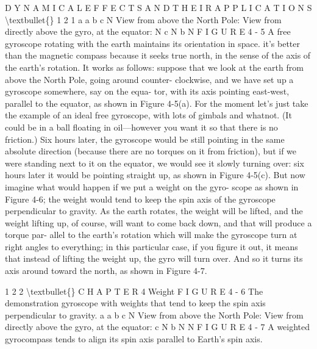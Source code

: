 \documentclass[10pt,oneside]{article}
\begin{document}
D Y N A M I C A L  E F F E C T S  A N D  T H E I R  A P P L I C A T I O N S \textbackslash{}textbullet\{\} 1 2 1 a a b c N View from above the North Pole: View from directly above the gyro, at the equator: N c N b N F I G U R E  4 - 5 A free gyroscope rotating with the earth maintains its orientation in space. it’s better than the magnetic compass because it seeks true north, in the sense of the axis of the earth’s rotation. It works as follows: suppose that we look at the earth from above the North Pole, going around counter- clockwise, and we have set up a gyroscope somewhere, say on the equa- tor, with its axis pointing east-west, parallel to the equator, as shown in Figure 4-5(a). For the moment let’s just take the example of an ideal free gyroscope, with lots of gimbals and whatnot. (It could be in a ball floating in oil---however you want it so that there is no friction.) Six hours later, the gyroscope would be still pointing in the same absolute direction (because there are no torques on it from friction), but if we were standing next to it on the equator, we would see it slowly turning over: six hours later it would be pointing straight up, as shown in Figure 4-5(c). But now imagine what would happen if we put a weight on the gyro- scope as shown in Figure 4-6; the weight would tend to keep the spin axis of the gyroscope perpendicular to gravity. As the earth rotates, the weight will be lifted, and the weight lifting up, of course, will want to come back down, and that will produce a torque par- allel to the earth’s rotation which will make the gyroscope turn at right angles to everything; in this particular case, if you figure it out, it means that instead of lifting the weight up, the gyro will turn over. And so it turns its axis around toward the north, as shown in Figure 4-7.\par

1 2 2 \textbackslash{}textbullet\{\} C H A P T E R  4 Weight F I G U R E  4 - 6 The demonstration gyroscope with weights that tend to keep the spin axis perpendicular to gravity. a a b c N View from above the North Pole: View from directly above the gyro, at the equator: c N b N N F I G U R E  4 - 7 A weighted gyrocompass tends to align its spin axis parallel to Earth’s spin axis.\par
\end{document}
